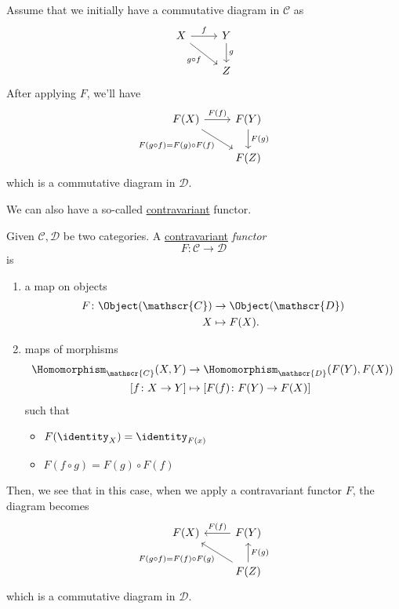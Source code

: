 \begin{prev}
	Assume that we initially have a commutative diagram in \(\mathscr{C} \) as
	\[
		\begin{tikzcd}
			X \ar[rd, "g\circ f"']\ar[r, "f"] & Y\ar[d, "g"]\\
			& Z
		\end{tikzcd}
	\]
	After applying \(F\), we'll have
	\[
		\begin{tikzcd}
			F(X) \ar[rd, "F(g\circ f)=F(g)\circ F(f)"']\ar[r, "F(f)"] & F(Y)\ar[d, "F(g)"]\\
			& F(Z)
		\end{tikzcd}
	\]
	which is a commutative diagram in \(\mathscr{D}\).
\end{prev}

We can also have a so-called \underline{contravariant} functor.
\begin{definition}\label{def:contravariant-functor}
	Given \(\mathscr{C} , \mathscr{D} \) be two categories. A \underline{contravariant} \emph{functor}
	\[
		F\colon \mathscr{C} \to \mathscr{D}
	\]
	is
	\begin{enumerate}
		\item a map on objects
		      \[
			      \begin{split}
				      F\colon \Object(\mathscr{C} )&\to \Object(\mathscr{D} )\\
				      X&\mapsto F(X).
			      \end{split}
		      \]
		\item maps of morphisms
		      \[
			      \begin{split}
				      \Homomorphism_{\mathscr{C} }(X, Y)&\to \Homomorphism_{\mathscr{D} }(F(Y), F(X))\\
				      \left[f\colon X\to Y\right] &\mapsto \left[F(f)\colon F(Y)\to F(X)\right]
			      \end{split}
		      \]
		      such that
		      \begin{itemize}
			      \item \(F(\identity_{X} ) = \identity_{F(x)} \)
			      \item \(F(f\circ g) = F(g)\circ F(f)\)
		      \end{itemize}
	\end{enumerate}
\end{definition}

Then, we see that in this case, when we apply a contravariant functor \(F\), the diagram becomes
\[
	\begin{tikzcd}
		F(X)  & F(Y)\ar[l, "F(f)"']\\
		& F(Z)\ar[lu, "F(g\circ f)=F(f)\circ F(g)"]\ar[u, "F(g)"']
	\end{tikzcd}
\]
which is a commutative diagram in \(\mathscr{D}\).

